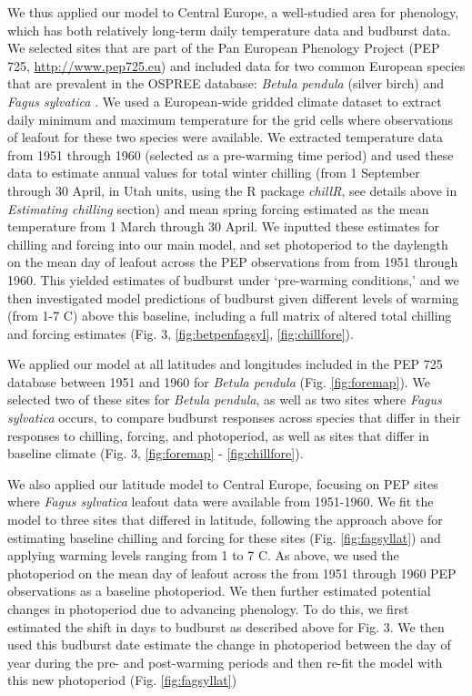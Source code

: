 \documentclass{article}
\begin{document}
\par We thus applied our model to Central Europe, a well-studied area for phenology, which has both relatively long-term daily temperature data and budburst data. We selected sites that are part of the Pan European Phenology Project (PEP 725, \url{http://www.pep725.eu}) and included data for two common European species that are prevalent in the OSPREE database: \emph{Betula pendula} (silver birch) and \emph{Fagus sylvatica} \citep[European beech,][]{Templ2018}. We used a European-wide gridded climate dataset \citep[E-OBs][]{cornes2018} to extract daily minimum and maximum temperature for the grid cells where observations of leafout for these two species were available. We extracted temperature data from 1951 through 1960 (selected as a pre-warming time period) and used these data to estimate annual values for total winter chilling (from 1 September through 30 April, in Utah units, using the R package \textit{chillR}, see details above in \emph{Estimating chilling} section) and mean spring forcing estimated as the mean temperature from 1 March through 30 April. We inputted these estimates for chilling and forcing into our main model, and set photoperiod to the daylength on the mean day of leafout across the PEP observations from from 1951 through 1960. This yielded estimates of budburst under `pre-warming conditions,' and we then investigated model predictions of budburst given different levels of warming (from 1-7 \degree C) above this baseline, including a full matrix of altered total chilling and forcing estimates (Fig. 3, \ref{fig:betpenfagsyl}, \ref{fig:chillfore}). 
\par We applied our model at all latitudes and longitudes included in the PEP 725 database between 1951 and 1960 for \emph{Betula pendula} (Fig. \ref{fig:foremap}). We selected two of these sites for \emph{Betula pendula}, as well as two sites where \emph{Fagus sylvatica} occurs, to compare budburst responses across species that differ in their responses to chilling, forcing, and photoperiod, as well as sites that differ in baseline climate (Fig. 3, \ref{fig:foremap} - \ref{fig:chillfore}).
\par We also applied our latitude model to Central Europe, focusing on PEP sites where \emph{Fagus sylvatica} leafout data were available from 1951-1960. We fit the model to three sites that differed in latitude, following the approach above for estimating baseline chilling and forcing for these sites (Fig. \ref{fig:fagsyllat}) and applying warming levels ranging from 1 to 7 \degree C.   As above, we used the photoperiod on the mean day of leafout across the from 1951 through 1960 PEP observations as a baseline photoperiod. We then further estimated potential changes in photoperiod due to advancing phenology. To do this, we first estimated the shift in days to budburst as described above for Fig. 3. %
We then used this budburst date estimate the change in photoperiod between the day of year during the pre- and post-warming periods and then re-fit the model with this new photoperiod (Fig. \ref{fig:fagsyllat})
\end{document}
